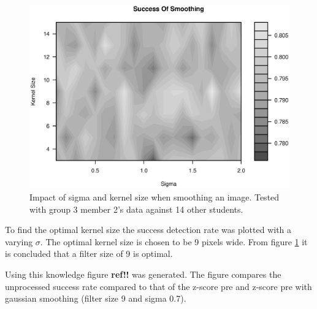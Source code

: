 \begin{figure}[H]
\centering
\includegraphics[width = \textwidth]{graphics/success_of_smoothing_contour}
\caption[Optimal smoothing]{Impact of sigma and kernel size when smoothing an image. 
Tested with group 3 member 2's data against 14 other students.
}
\label{fig:smoothing_contour}
\end{figure}

To find the optimal kernel size the success detection rate was plotted with a varying $\sigma$. 
The optimal kernel size is chosen to be 9 pixels wide.
From figure \ref{fig:smoothing_contour} it is concluded that a filter size of 9 is optimal.

Using this knowledge figure \textbf{ref!!} was generated.
The figure compares the unprocessed success rate compared to that of the z-score pre and z-score pre with gaussian smoothing (filter size 9 and sigma 0.7).



